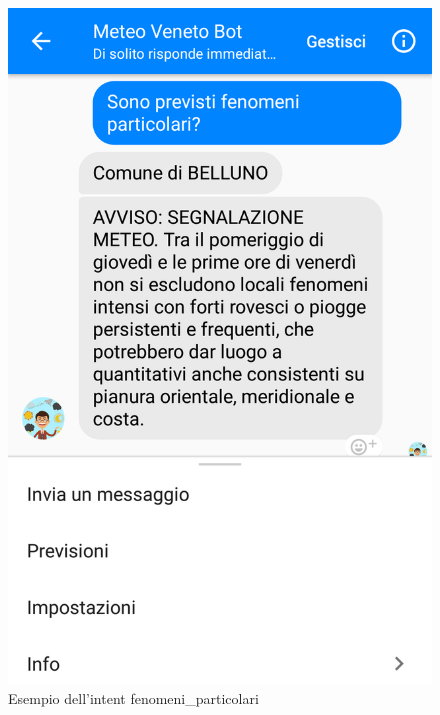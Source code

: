 \begin{itemize}
\begin{figure}[!h]
		\includegraphics[scale=0.15]{../Immagini/fenomeni.png}
		\caption{Esempio dell'intent fenomeni\_particolari}
	\end{figure}

\end{itemize}

